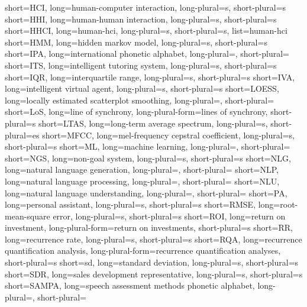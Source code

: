 	{short=HCI, 	long=human-computer interaction,					long-plural=s, short-plural=s}
	{short=HHI, 	long=human-human interaction,						long-plural=s, short-plural=s}
	{short=HHCI, 	long=human-\acl*{hci},								long-plural=s, short-plural=s, list=human-\acl*{hci}}
	{short=HMM, 	long=hidden markov model, 							long-plural=s, short-plural=s}
	{short=IPA,		long=international phonetic alphabet, 				long-plural=, short-plural=}
	{short=ITS, 	long=intelligent tutoring system, 					long-plural=s, short-plural=s}
	{short=IQR, 	long=interquartile range,							long-plural=s, short-plural=s}
	{short=IVA,		long=intelligent virtual agent, 					long-plural=s, short-plural=s}
	{short=LOESS, 	long=locally estimated scatterplot smoothing, 		long-plural=, short-plural=}
	{short=LoS, 	long=line of synchrony,								long-plural-form=lines of synchrony, short-plural=s}
	{short=LTAS, 	long=long-term average spectrum,					long-plural=s, short-plural=es}
	{short=MFCC, 	long=mel-frequency cepstral coefficient,			long-plural=s, short-plural=s}
		{short=ML, 		long=machine learning, 								long-plural=, short-plural=}
	{short=NGS, 	long=non-goal system, 								long-plural=s, short-plural=s}
	{short=NLG, 	long=natural language generation, 					long-plural=, short-plural=}
	{short=NLP, 	long=natural language processing, 					long-plural=, short-plural=}
	{short=NLU, 	long=natural language understanding, 				long-plural=, short-plural=}
		{short=PA, 		long=personal assistant, 							long-plural=s, short-plural=s}
	{short=RMSE, 	long=root-mean-square error,						long-plural=s, short-plural=s}
	{short=ROI, 	long=return on investment,							long-plural-form=return on investments, short-plural=s}
		{short=RR,	 	long=recurrence rate,								long-plural=s, short-plural=s}
	{short=RQA,	 	long=recurrence quantification analysis,			long-plural-form=recurrence quantification analyses, short-plural=s}
		{short=sd, 		long=standard deviation, 							long-plural=s, short-plural=s}
	{short=SDR, 	long=sales development representative,				long-plural=s, short-plural=s}
	{short=SAMPA, 	long=speech assessment methods phonetic alphabet, 	long-plural=, short-plural=}
